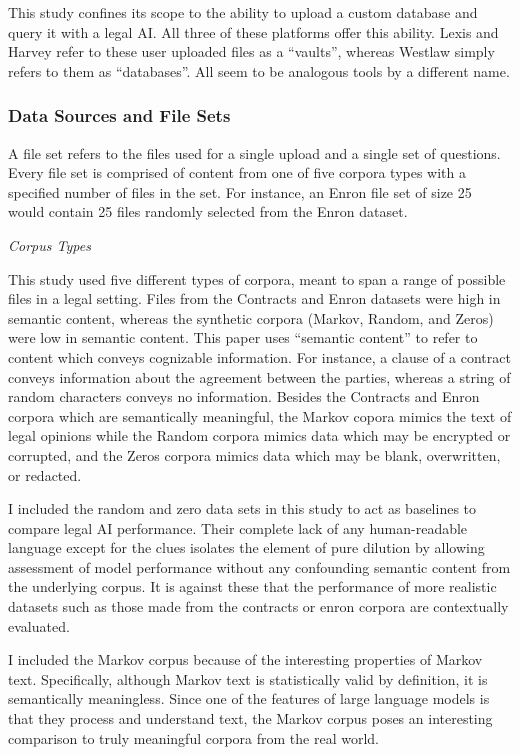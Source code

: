 \documentclass[
]{article}
\begin{document}
This study confines its scope to the ability to upload a custom database and query it with a legal AI. All three of these platforms offer this ability. Lexis and Harvey refer to these user uploaded files as a ``vaults'', whereas Westlaw simply refers to them as ``databases''. All seem to be analogous tools by a different name.

\subsubsection{Data Sources and File Sets}\label{data-sources-and-file-sets}

A file set refers to the files used for a single upload and a single set of questions. Every file set is comprised of content from one of five corpora types with a specified number of files in the set. For instance, an Enron file set of size 25 would contain 25 files randomly selected from the Enron dataset.

\emph{Corpus Types}

This study used five different types of corpora, meant to span a range of possible files in a legal setting. Files from the Contracts and Enron datasets were high in semantic content, whereas the synthetic corpora (Markov, Random, and Zeros) were low in semantic content. This paper uses ``semantic content'' to refer to content which conveys cognizable information. For instance, a clause of a contract conveys information about the agreement between the parties, whereas a string of random characters conveys no information. Besides the Contracts and Enron corpora which are semantically meaningful, the Markov copora mimics the text of legal opinions while the Random corpora mimics data which may be encrypted or corrupted, and the Zeros corpora mimics data which may be blank, overwritten, or redacted.

I included the random and zero data sets in this study to act as baselines to compare legal AI performance. Their complete lack of any human-readable language except for the clues isolates the element of pure dilution by allowing assessment of model performance without any confounding semantic content from the underlying corpus. It is against these that the performance of more realistic datasets such as those made from the contracts or enron corpora are contextually evaluated.

I included the Markov corpus because of the interesting properties of Markov text. Specifically, although Markov text is statistically valid by definition, it is semantically meaningless. Since one of the features of large language models is that they process and understand text, the Markov corpus poses an interesting comparison to truly meaningful corpora from the real world.
\end{document}
